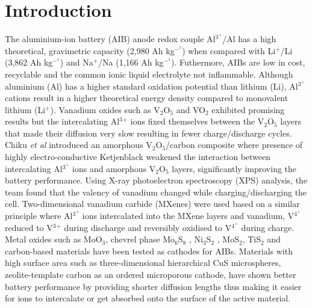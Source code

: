 \documentclass[num-refs]{wiley-article}
\begin{document}
\section{Introduction}
 The aluminium-ion battery (AIB) anode redox couple Al$^3^+$/Al has a high theoretical, gravimetric capacity (2,980 Ah kg$^-^1$) when compared with Li$^+$/Li (3,862 Ah kg$^-^1$) and Na$^+$/Na (1,166 Ah kg$^-^1$). Futhermore, AIBs are low in cost, recyclable and the common ionic liquid electrolyte not inflammable. Although aluminium (Al) has a higher standard oxidation potential than lithium (Li), Al$^3^+$ cations result in a higher theoretical energy density compared to monovalent lithium (Li$^+$). Vanadium oxides such as V$_2$O$_5$ and VO$_2$ exhibited promising results but the intercalating Al$^3{^+}$ ions fixed themselves between the V$_2$O${_5}$ layers that made their diffusion very slow resulting in fewer charge/discharge cycles. Chiku \textit{et al} \cite{chiku_amorphous_2015} introduced an amorphous V$_2$O${_5}$/carbon composite where presence of highly electro-conductive Ketjenblack weakened the interaction between intercalating Al$^3^+$ ions and amorphous V$_2$O$_5$ layers, significantly improving the battery performance. Using X-ray photoelectron spectroscopy (XPS) analysis, the team found that the valency of vanadium changed while charging/discharging the cell. Two-dimensional vanadium carbide (MXenes)\cite{vahidmohammadi_two-dimensional_2017} were used based on a similar principle where Al$^3^+$ ions intercalated into the MXene layers and vanadium, V$^4^+$ reduced to V$^3{^+}$ during discharge and reversibly oxidised to V$^4^+$ during charge. Metal oxides such as MoO$_3$\cite{lahan_al3+_2019}, chevrel phase Mo$_6$S$_8$ \cite{geng_reversible_2015}, Ni$_3$S$_2$ \cite{wang_novel_2016}, MoS$_2$\cite{li_rechargeable_2018}, TiS$_2$\cite{geng_titanium_2017} and carbon-based materials have been tested as cathodes for AIBs. Materials with high surface area such as three-dimensional hierarchical CuS microspheres\cite{wang_high-performance_2017}, zeolite-template carbon\cite{stadie_zeolite-templated_2017} as an ordered microporous cathode, have shown better battery performance by providing shorter diffusion lengths thus making it easier for ions to intercalate or get absorbed onto the surface of the active material. 
\end{document}
